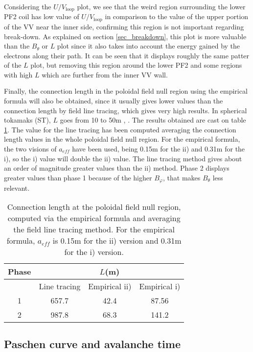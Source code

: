 \documentclass[a4paper,12pt,oneside]{book}
\begin{document}
Considering the $U/V_\text{loop}$ plot, we see that the weird region surrounding the lower PF2 coil has low value of $U/V_\text{loop}$ in comparison to the value of the upper portion of the VV near the inner side, confirming this region is not important regarding break-down. As explained on section \ref{sec_breakdown}, this plot is more valuable than the $B_\theta$ or $L$ plot since it also takes into account the energy gained by the electrons along their path. It can be seen that it displays roughly the same patter of the $L$ plot, but removing this region around the lower PF2 and some regions with high $L$ which are further from the inner VV wall.

Finally, the connection length in the poloidal field null region using the empirical formula will also be obtained, since it usually gives lower values than the connection length by field line tracing, which gives very high results. In spherical tokamaks (ST), $L$ goes from 10 to 50m \cite{VEST_2015}, \cite{Globus_2001}. The results obtained are cast on table \ref{table_L}. The value for the line tracing has been computed averaging the connection length values in the whole poloidal field null region. For the empirical formula, the two visions of $a_{eff}$ have been used, being 0.15m for the ii) and 0.31m for the i), so the i) value will double the ii) value. The line tracing method gives about an order of magnitude greater values than the ii) method. Phase 2 displays greater values than phase 1 because of the higher $B_\varphi$, that makes $B_\theta$ less relevant.



\begin{table}[htbp]
\centering
	\begin{tabular}{|c|c|c|c|} \hline
Phase	 & \multicolumn{3}{|c|}{$L$(m)} \\ \hline
	& Line tracing & Empirical ii) & Empirical i) \\ \hline 
	1 & 657.7 & 42.4 & 87.56 \\ \hline
	2 & 987.8 & 68.3 & 141.2 \\ \hline
	\end{tabular}
	\caption{Connection length at the poloidal field null region, computed via the empirical formula and averaging the field line tracing method. For the empirical formula, $a_{eff}$ is 0.15m for the ii) version and 0.31m for the i) version.}
\label{table_L}
\end{table}




\subsection{Paschen curve and avalanche time}
\end{document}
